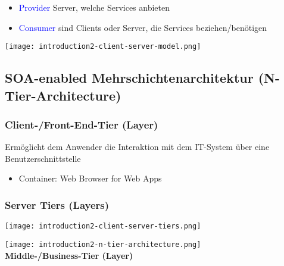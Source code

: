 \begin{itemize}
    \item \textcolor{blue}{Provider} Server, welche Services anbieten
    \item \textcolor{blue}{Consumer} sind Clients oder Server, die Services beziehen/benötigen
\end{itemize}

\texttt{[image: introduction2-client-server-model.png]}


\subsection{SOA-enabled Mehrschichtenarchitektur (N-Tier-Architecture)}

\subsubsection{Client-/Front-End-Tier (Layer)}

Ermöglicht dem Anwender die Interaktion mit dem IT-System über eine Benutzerschnittstelle

\begin{itemize}
    \item Container: Web Browser for Web Apps
\end{itemize}

\subsubsection{Server Tiers (Layers)}

\texttt{[image: introduction2-client-server-tiers.png]}

\texttt{[image: introduction2-n-tier-architecture.png]} \\

\textbf{Middle-/Business-Tier (Layer)}


